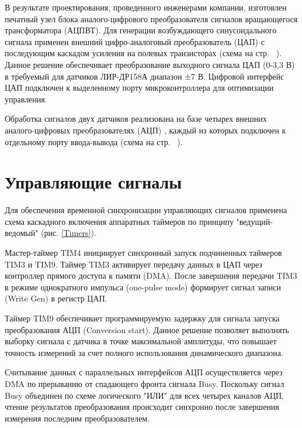 В результате проектирования, проведенного инженерами компании, изготовлен печатный узел блока аналого-цифрового преобразователя сигналов вращающегося трансформатора (АЦПВТ). 
Для генерации возбуждающего синусоидального сигнала применен внешний цифро-аналоговый преобразователь (ЦАП)\cite{DAC} с последующим каскадом усиления 
на полевых транзисторах (схема на стр. ~\pageref{DAC}). Данное решение обеспечивает преобразование выходного сигнала ЦАП (0-3,3 В) в требуемый для датчиков ЛИР-ДР158А диапазон ±7 В. 
Цифровой интерфейс ЦАП подключен к выделенному порту микроконтроллера для оптимизации управления. 

Обработка сигналов двух датчиков реализована на базе четырех внешних аналого-цифровых преобразователях (АЦП) \cite{ADC}, каждый из которых подключен к 
отдельному порту ввода-вывода (схема на стр. ~\pageref{ADC}).



\FloatBarrier

\section{Управляющие сигналы}
Для обеспечения временной синхронизации управляющих сигналов применена схема каскадного включения аппаратных таймеров по принципу 
"ведущий-ведомый" \space (рис. \ref{Timers}). 

Мастер-таймер TIM4 инициирует синхронный запуск подчиненных таймеров TIM3 и TIM9. 
Таймер TIM3 активирует передачу данных в ЦАП через контроллер прямого доступа к памяти (DMA). 
После завершения передачи TIM3 в режиме однократного импульса (one-pulse mode) формирует сигнал записи (Write Gen) в регистр ЦАП. 

Таймер TIM9 обеспечивает программируемую задержку для сигнала запуска преобразования АЦП (Conversion start). 
Данное решение позволяет выполнять выборку сигнала с датчика в точке максимальной амплитуды, что повышает точность измерений за счет полного 
использования динамического диапазона.

Считывание данных с параллельных интерфейсов АЦП осуществляется через DMA по прерыванию от спадающего фронта сигнала Busy. 
Поскольку сигнал Busy объединен по схеме логического "ИЛИ" \space для всех четырех каналов АЦП, чтение результатов преобразования происходит 
синхронно после завершения измерения последним преобразователем.

